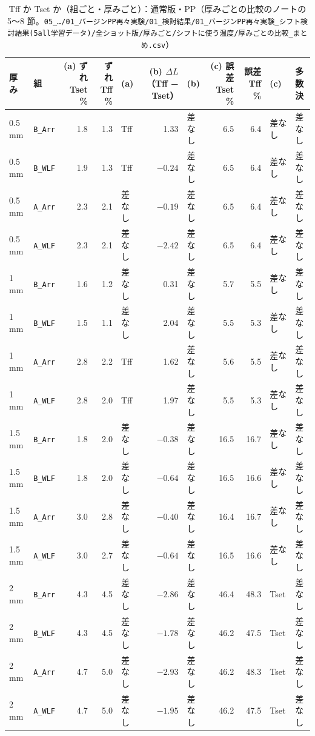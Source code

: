 \documentclass[paper=a4paper,landscape,fontsize=10pt,line_length=62zw,number_of_lines=34]{jlreq}
\begin{document}
\begin{table}[H]\centering\footnotesize
\caption{Tff か Tset か（組ごと・厚みごと）：通常版・PP（厚みごとの比較のノートの 5〜8 節。\texttt{05\_\allowbreak{}…/\allowbreak{}01\_\allowbreak{}バージンPP再々実験/\allowbreak{}01\_\allowbreak{}検討結果/\allowbreak{}01\_\allowbreak{}バージンPP再々実験\_\allowbreak{}シフト検討結果(5all学習データ)/\allowbreak{}全ショット版/\allowbreak{}厚みごと/\allowbreak{}シフトに使う温度/\allowbreak{}厚みごとの比較\_\allowbreak{}まとめ.csv}）}
\begin{tabular}{llrrlrlrrll}
\toprule
厚み & 組 & (a) ずれ Tset \% & ずれ Tff \% & (a) & (b) $\Delta L$（Tff − Tset） & (b) & (c) 誤差 Tset \% & 誤差 Tff \% & (c) & 多数決 \\
\midrule
0.5 mm & \texttt{B\_\allowbreak{}Arr} & 1.8 & 1.3 & Tff & 1.33 & 差なし & 6.5 & 6.4 & 差なし & 差なし \\
0.5 mm & \texttt{B\_\allowbreak{}WLF} & 1.9 & 1.3 & Tff & $-0.24$ & 差なし & 6.5 & 6.4 & 差なし & 差なし \\
0.5 mm & \texttt{A\_\allowbreak{}Arr} & 2.3 & 2.1 & 差なし & $-0.19$ & 差なし & 6.5 & 6.4 & 差なし & 差なし \\
0.5 mm & \texttt{A\_\allowbreak{}WLF} & 2.3 & 2.1 & 差なし & $-2.42$ & 差なし & 6.5 & 6.4 & 差なし & 差なし \\
1 mm & \texttt{B\_\allowbreak{}Arr} & 1.6 & 1.2 & 差なし & 0.31 & 差なし & 5.7 & 5.5 & 差なし & 差なし \\
1 mm & \texttt{B\_\allowbreak{}WLF} & 1.5 & 1.1 & 差なし & 2.04 & 差なし & 5.5 & 5.3 & 差なし & 差なし \\
1 mm & \texttt{A\_\allowbreak{}Arr} & 2.8 & 2.2 & Tff & 1.62 & 差なし & 5.6 & 5.5 & 差なし & 差なし \\
1 mm & \texttt{A\_\allowbreak{}WLF} & 2.8 & 2.0 & Tff & 1.97 & 差なし & 5.5 & 5.3 & 差なし & 差なし \\
1.5 mm & \texttt{B\_\allowbreak{}Arr} & 1.8 & 2.0 & 差なし & $-0.38$ & 差なし & 16.5 & 16.7 & 差なし & 差なし \\
1.5 mm & \texttt{B\_\allowbreak{}WLF} & 1.8 & 2.0 & 差なし & $-0.64$ & 差なし & 16.5 & 16.6 & 差なし & 差なし \\
1.5 mm & \texttt{A\_\allowbreak{}Arr} & 3.0 & 2.8 & 差なし & $-0.40$ & 差なし & 16.4 & 16.7 & 差なし & 差なし \\
1.5 mm & \texttt{A\_\allowbreak{}WLF} & 3.0 & 2.7 & 差なし & $-0.64$ & 差なし & 16.5 & 16.6 & 差なし & 差なし \\
2 mm & \texttt{B\_\allowbreak{}Arr} & 4.3 & 4.5 & 差なし & $-2.86$ & 差なし & 46.4 & 48.3 & Tset & 差なし \\
2 mm & \texttt{B\_\allowbreak{}WLF} & 4.3 & 4.5 & 差なし & $-1.78$ & 差なし & 46.2 & 47.5 & Tset & 差なし \\
2 mm & \texttt{A\_\allowbreak{}Arr} & 4.7 & 5.0 & 差なし & $-2.93$ & 差なし & 46.2 & 48.3 & Tset & 差なし \\
2 mm & \texttt{A\_\allowbreak{}WLF} & 4.7 & 5.0 & 差なし & $-1.95$ & 差なし & 46.2 & 47.5 & Tset & 差なし \\
\bottomrule
\end{tabular}
\end{table}
\clearpage
\end{document}
